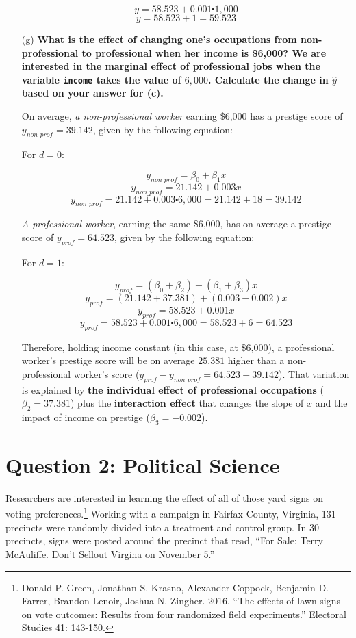\documentclass[12pt,letterpaper]{article}
\begin{document}
\begin{enumerate}
		$$y = 58.523 + 0.001 \centerdot 1,000$$
		$$y = 58.523 + 1 = 59.523$$
	
	\item [(g)]
	\textbf{What is the effect of changing one's occupations from non-professional to professional when her income is \$6,000? We are interested in the marginal effect of professional jobs when the variable \texttt{income} takes the value of $6,000$. Calculate the change in $\hat{y}$ based on your answer for (c).}
	
		On average, \textit{a non-professional worker} earning \$6,000 has a prestige score of $y_{non\_prof} = 39.142$, given by the following equation:
		
		\begin{center}
			For $d = 0$:
		\end{center}
		$$y_{non\_prof} = \beta_0 + \beta_1 x$$
		$$y_{non\_prof} = 21.142 + 0.003x$$
		$$y_{non\_prof} = 21.142 + 0.003 \centerdot 6,000 = 21.142 + 18 = 39.142$$
		
		\textit{A professional worker}, earning the same \$6,000, has on average a prestige score of $y_{prof} = 64.523$, given by the following equation:
		
		\begin{center}
			For $d = 1$:
		\end{center}
		$$y_{prof} = (\beta_0 + \beta_2) + (\beta_1 + \beta_3)x$$
		$$y_{prof} = (21.142 + 37.381) + (0.003 - 0.002)x$$
		$$y_{prof} = 58.523 + 0.001x$$
		$$y_{prof} = 58.523 + 0.001 \centerdot 6,000 = 58.523 + 6 = 64.523$$
		
		Therefore, holding income constant (in this case, at \$6,000), a professional worker's prestige score will be on average $25.381$ higher than a non-professional worker's score ($y_{prof} - y_{non\_prof} = 64.523 - 39.142$). That variation is explained by \textbf{the individual effect of professional occupations} ($\beta_2 = 37.381$) plus the \textbf{interaction effect} that changes the slope of $x$ and the impact of income on prestige ($\beta_3 = -0.002$).
	
\end{enumerate}

\newpage

\section*{Question 2: Political Science}
\vspace{.25cm}
\noindent 	Researchers are interested in learning the effect of all of those yard signs on voting preferences.\footnote{Donald P. Green, Jonathan	S. Krasno, Alexander Coppock, Benjamin D. Farrer,	Brandon Lenoir, Joshua N. Zingher. 2016. ``The effects of lawn signs on vote outcomes: Results from four randomized field experiments.'' Electoral Studies 41: 143-150. } Working with a campaign in Fairfax County, Virginia, 131 precincts were randomly divided into a treatment and control group. In 30 precincts, signs were posted around the precinct that read, ``For Sale: Terry McAuliffe. Don't Sellout Virgina on November 5.'' \\
\end{document}
